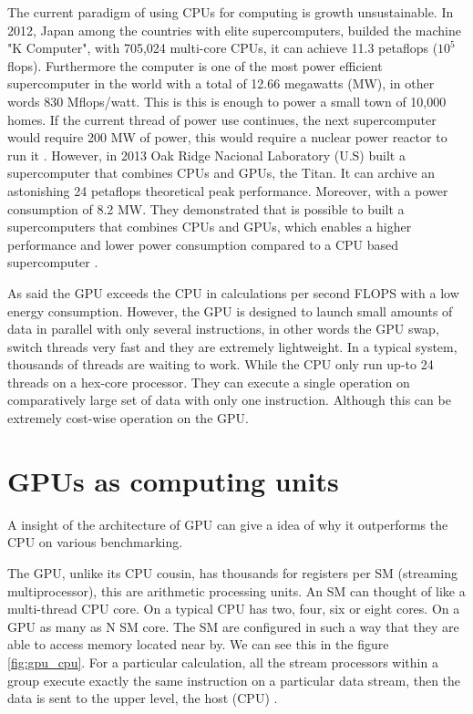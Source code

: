 The current paradigm of using CPUs for computing is growth unsustainable. In 2012, Japan among the countries with elite supercomputers, builded the machine "K Computer", with 705,024 multi-core CPUs, it can achieve 11.3 petaflops ($10^5$ flops). Furthermore the computer is one of the most power efficient supercomputer in the world with a total of 12.66 megawatts (MW), in other words 830 Mflops/watt. This is this is enough to power a small town of 10,000 homes. If the current thread of power use continues, the next supercomputer would require 200 MW of power, this would require a nuclear power reactor to run it \cite{whatexascale}. However, in 2013 Oak Ridge Nacional Laboratory (U.S) built a supercomputer that combines CPUs and GPUs, the Titan. It can archive an astonishing 24 petaflops theoretical peak performance. Moreover, with a power consumption of 8.2 MW. They demonstrated that is possible to built a supercomputers that combines CPUs and GPUs, which enables a  higher performance and lower power consumption compared to a CPU based supercomputer \cite{titan}.

As said the GPU exceeds the CPU in calculations per second FLOPS with a low energy consumption. However, the GPU is designed to launch small amounts of data in parallel with only several instructions, in other words the GPU swap, switch threads very fast and they are extremely lightweight. In a typical system, thousands of threads are waiting to work. While the CPU only run up-to 24 threads on a hex-core processor. They can execute a single operation on comparatively large set of data with only one instruction. Although this can be extremely cost-wise operation on the GPU.

\section{GPUs as computing units}

A insight of the architecture of GPU can give a idea of  why it outperforms the CPU on various benchmarking.

The GPU, unlike its CPU cousin, has thousands for registers per SM (streaming multiprocessor), this are arithmetic processing units. An SM can thought of like a multi-thread CPU core. On a typical CPU has two, four, six or eight cores. On a GPU as many as N SM core. The SM are configured in such a way that they are able to access memory located near by. We can see this in the figure \ref{fig:gpu_cpu}. For a particular calculation, all the stream processors within a group execute exactly the same instruction on a particular data stream, then the data is sent to the upper level, the host (CPU) \cite{cook}.

